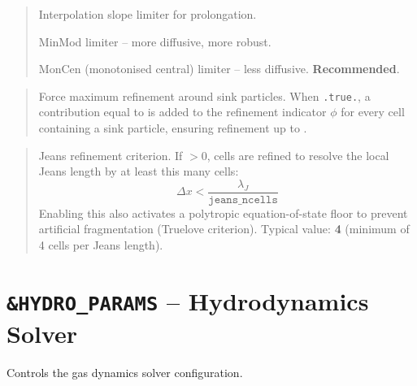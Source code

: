 \label{param:interpol_type}

\begin{quote}
Interpolation slope limiter for prolongation.
\begin{description}[style=nextline,leftmargin=1.5cm,font=\ttfamily]
  \item[0] MinMod limiter -- more diffusive, more robust.
  \item[1] MonCen (monotonised central) limiter -- less diffusive.
        \textbf{Recommended}.
\end{description}
\end{quote}

\label{param:sink_refine}

\begin{quote}
Force maximum refinement around sink particles.  When \texttt{.true.},
a contribution equal to  is added to the
refinement indicator $\phi$ for every cell containing a sink particle,
ensuring refinement up to .
\end{quote}

\label{param:jeans_ncells}

\begin{quote}
Jeans refinement criterion.  If $> 0$, cells are refined to resolve
the local Jeans length by at least this many cells:
\[
  \Delta x < \frac{\lambda_J}{\texttt{jeans\_ncells}}
\]
Enabling this also activates a polytropic equation-of-state floor to
prevent artificial fragmentation (Truelove criterion).  Typical
value: \textbf{4} (minimum of 4 cells per Jeans length).
\end{quote}


\section{\texttt{\&HYDRO\_PARAMS} -- Hydrodynamics Solver}
\label{sec:hydro_params}

Controls the gas dynamics solver configuration.

\label{param:gamma}

